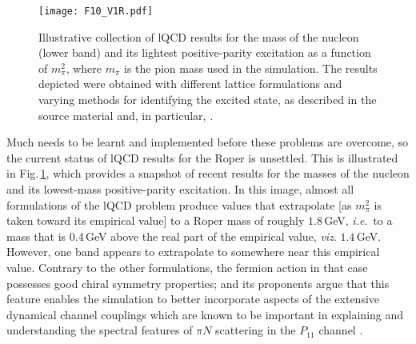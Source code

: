 \begin{figure}[t]


\centerline{%
\texttt{[image: F10\_V1R.pdf]}}

\caption{\label{lQCDRoper1}
%
Illustrative collection of lQCD results for the mass of the nucleon (lower band) and its lightest positive-parity excitation as a function of $m_\pi^2$, where $m_\pi$ is the pion mass used in the simulation.  The results depicted were obtained with different lattice formulations and varying methods for identifying the excited state, as described in the source material \cite{Mahbub:2010rm, Edwards:2011jj, Engel:2013ig, Liu:2014jua, Alexandrou:2014mka} and, in particular, \cite{Liu:2016rwa}.}
\end{figure}

Much needs to be learnt and implemented before these problems are overcome, so the current status of lQCD results for the Roper is unsettled.  This is illustrated in Fig.\,\ref{lQCDRoper1}, which provides a snapshot of recent results for the masses of the nucleon and its lowest-mass positive-parity excitation.  In this image, almost all formulations of the lQCD problem produce values that extrapolate [as $m_\pi^2$ is taken toward its empirical value] to a Roper mass of roughly $1.8\,$GeV, \emph{i.e}.\ to a mass that is 0.4\,GeV above the real part of the empirical value, \emph{viz}. $1.4\,$GeV.  However, one band appears to extrapolate to somewhere near this empirical value.  Contrary to the other formulations, the fermion action in that case \cite{Liu:2014jua} possesses good chiral symmetry properties; and its proponents argue \cite{Liu:2016rwa} that this feature enables the simulation to better incorporate aspects of the extensive dynamical channel couplings which are known to be important in explaining and understanding the spectral features of $\pi N$ scattering in the $P_{11}$ channel \cite{JuliaDiaz:2007kz, Suzuki:2009nj, Kamano:2010ud}.

